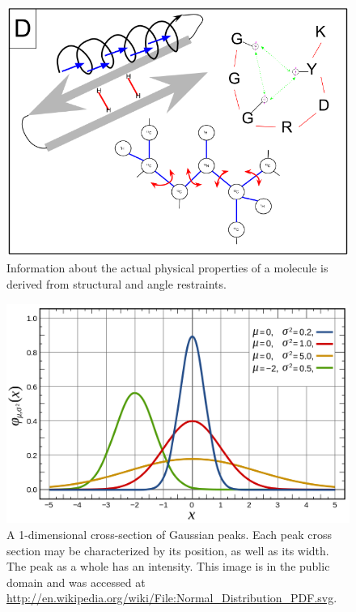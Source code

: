 \begin{figure}
  \includegraphics[scale=0.6]{figures/data_overview_4}
  \caption[Information about the actual physical properties of a molecule.]
          {Information about the actual physical properties of a molecule
           is derived from structural and angle restraints.}
  \label{data_overview_4}
\end{figure}

\begin{figure}
  \includegraphics[scale=0.4]{figures/peak_1d}
  \caption[A 1-dimensional cross-section of Gaussian peaks.]
          {A 1-dimensional cross-section of Gaussian peaks.
           Each peak cross section may be characterized by its 
           position, as well as its width.  The peak as a whole
           has an intensity.  This image is in the
           public domain and was accessed at 
           \url{http://en.wikipedia.org/wiki/File:Normal_Distribution_PDF.svg}.}
  \label{peak_1d}
\end{figure}


